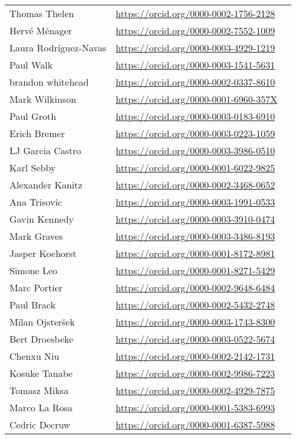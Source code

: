\begin{longtable}{lll}
  Thomas Thelen & \url{https://orcid.org/0000-0002-1756-2128}
\\
  Hervé Ménager & \url{https://orcid.org/0000-0002-7552-1009}
\\
  Laura Rodríguez-Navas & \url{https://orcid.org/0000-0003-4929-1219}
\\
  Paul Walk & \url{https://orcid.org/0000-0003-1541-5631}
\\
  brandon whitehead & \url{https://orcid.org/0000-0002-0337-8610}
\\
  Mark Wilkinson & \url{https://orcid.org/0000-0001-6960-357X}
\\
  Paul Groth & \url{https://orcid.org/0000-0003-0183-6910}
\\
  Erich Bremer & \url{https://orcid.org/0000-0003-0223-1059}
\\
  LJ Garcia Castro & \url{https://orcid.org/0000-0003-3986-0510}
\\
  Karl Sebby & \url{https://orcid.org/0000-0001-6022-9825}
\\
  Alexander Kanitz & \url{https://orcid.org/0000-0002-3468-0652}
\\
  Ana Trisovic & \url{https://orcid.org/0000-0003-1991-0533}
\\
  Gavin Kennedy & \url{https://orcid.org/0000-0003-3910-0474}
\\
  Mark Graves & \url{https://orcid.org/0000-0003-3486-8193}
\\
  Jasper Koehorst & \url{https://orcid.org/0000-0001-8172-8981}
\\
  Simone Leo & \url{https://orcid.org/0000-0001-8271-5429}
\\
  Marc Portier & \url{https://orcid.org/0000-0002-9648-6484}
\\
  Paul Brack & \url{https://orcid.org/0000-0002-5432-2748}
\\
  Milan Ojsteršek & \url{https://orcid.org/0000-0003-1743-8300}
\\
  Bert Droesbeke & \url{https://orcid.org/0000-0003-0522-5674}
\\
  Chenxu Niu & \url{https://orcid.org/0000-0002-2142-1731}
\\
  Kosuke Tanabe & \url{https://orcid.org/0000-0002-9986-7223}
\\
  Tomasz Miksa & \url{https://orcid.org/0000-0002-4929-7875}
\\
  Marco La Rosa & \url{https://orcid.org/0000-0001-5383-6993}
\\
  Cedric Decruw & \url{https://orcid.org/0000-0001-6387-5988}
\\

\end{longtable}
